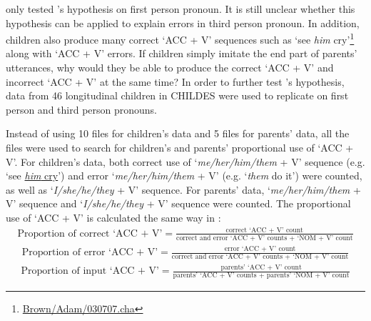 \cite{kirjavainen2009can} only tested \cite{tomasello2000,tomasello2003}'s hypothesis on first person pronoun. It is still unclear whether this hypothesis can be applied to explain errors in third person pronoun. In addition, children also produce many correct `ACC + V' sequences such as `see \textit{him} cry'\footnote{\href{https://sla.talkbank.org/TBB/childes/Eng-NA/Brown/Adam/030707.cha}{Brown/Adam/030707.cha}} along with `ACC + V' errors. If children simply imitate the end part of parents' utterances, why would they be able to produce the correct `ACC + V' and incorrect `ACC + V' at the same time? In order to further test \cite{tomasello2000,tomasello2003}'s hypothesis, data from 46 longitudinal children in CHILDES were used to replicate \cite{kirjavainen2009can} on first person and third person pronouns.

Instead of using 10 files for children's data and 5 files for parents' data, all the files were used to search for children's and parents' proportional use of `ACC + V'. For children's data, both correct use of `\textit{me/her/him/them} + V' sequence (e.g. `see \underline{\textit{him} cry}') and error `\textit{me/her/him/them} + V' (e.g. `\textit{them} do it') were counted, as well as `\textit{I/she/he/they} + V' sequence. For parents' data, `\textit{me/her/him/them} + V' sequence and `\textit{I/she/he/they} + V' sequence were counted. The proportional use of `ACC + V' is calculated the same way in \cite{kirjavainen2009can}:
\begin{align*}
    \text{Proportion of correct `ACC + V'} = \displaystyle\frac{\text{correct `ACC + V' count}}{\text{correct and error `ACC + V' counts +  `NOM + V' count}}
\end{align*}
\begin{align*}
    \text{Proportion of error `ACC + V'} = \displaystyle\frac{\text{error `ACC + V' count}}{\text{correct and error `ACC + V' counts +  `NOM + V' count}}
\end{align*}
\begin{align*}
    \text{Proportion of input `ACC + V'} = \displaystyle\frac{\text{parents' `ACC + V' count}}{\text{parents' `ACC + V' counts + parents' `NOM + V' count}}
\end{align*}
